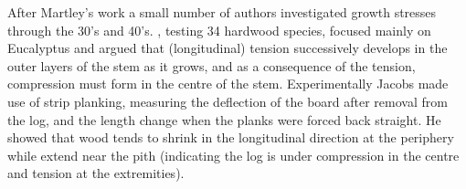 After Martley's work a small number of authors investigated growth stresses
through the 30's and 40's. \citet{jacobs1945l}, testing 34 hardwood species, focused
mainly on Eucalyptus and argued that (longitudinal) tension successively
develops in the outer layers of the stem as it grows, and as a consequence of
the tension, compression must form in the centre of the stem. 
Experimentally Jacobs made use of strip planking, measuring the deflection of
the board after removal from the log, and the length change when the planks were
forced back straight. He showed that wood tends to shrink in the longitudinal
direction at the periphery while extend near the pith (indicating the log
is under compression in the centre and tension at the extremities).